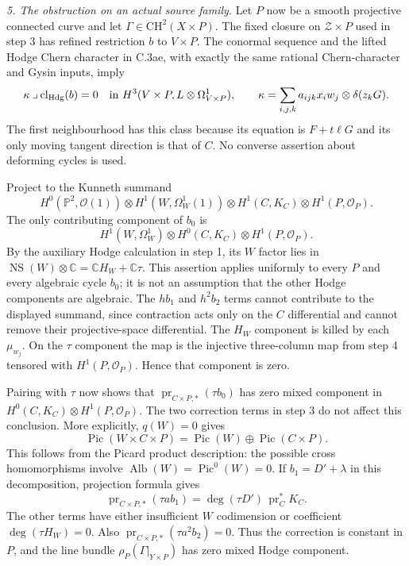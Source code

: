 \emph{5. The obstruction on an actual source family.}
Let $P$ now be a smooth projective connected curve
and let $\Gamma\in\mathrm{CH}^2(X\times P)$.
The fixed closure on $\mathcal Z\times P$ used in
step 3 has refined restriction $b$ to $V\times P$.
The conormal sequence and the lifted Hodge Chern
character in C.3ae, with exactly the same rational
Chern-character and Gysin inputs, imply
\[
 \kappa\mathbin{\lrcorner}\operatorname{cl}_{\mathrm{Hdg}}(b)
       =0\quad\hbox{in }
 H^3(V\times P,L\otimes\Omega^1_{V\times P}),
 \qquad
 \kappa=\sum_{i,j,k}a_{ijk}x_iw_j\otimes\delta(z_kG).
\]
The first neighbourhood has this class because its
equation is $F+t\ell G$ and its only moving tangent
direction is that of $C$. No converse assertion
about deforming cycles is used.

Project to the Kunneth summand
\[
 H^0(\mathbb P^2,\mathcal O(1))\otimes
 H^1(W,\Omega_W^1(1))\otimes
 H^1(C,K_C)\otimes H^1(P,\mathcal O_P).
\]
The only contributing component of $b_0$ is
\[
 H^1(W,\Omega_W^1)\otimes H^0(C,K_C)
                                  \otimes H^1(P,\mathcal O_P).
\]
By the auxiliary Hodge calculation in step 1, its
$W$ factor lies in
$\operatorname{NS}(W)\otimes\mathbb C
 =\mathbb C H_W+\mathbb C\tau$.
This assertion applies uniformly to every $P$ and
every algebraic cycle $b_0$; it is not an assumption
that the other Hodge components are algebraic.
The $h b_1$ and $h^2b_2$ terms cannot contribute to
the displayed summand, since contraction acts only
on the $C$ differential and cannot remove their
projective-space differential. The $H_W$ component
is killed by each $\mu_{w_j}$. On the $\tau$
component the map is the injective three-column
map from step 4 tensored with $H^1(P,\mathcal O_P)$.
Hence that component is zero.

Pairing with $\tau$ now shows that
$\operatorname{pr}_{C\times P,*}(\tau b_0)$ has
zero mixed component in
$H^0(C,K_C)\otimes H^1(P,\mathcal O_P)$.
The two correction terms in step 3 do not affect
this conclusion. More explicitly, $q(W)=0$ gives
\[
       \operatorname{Pic}(W\times C\times P)
       =\operatorname{Pic}(W)\oplus
                         \operatorname{Pic}(C\times P).
\]
This follows from the Picard product description:
the possible cross homomorphisms involve
$\operatorname{Alb}(W)=\operatorname{Pic}^0(W)=0$.
If $b_1=D'+\lambda$ in this decomposition, projection
formula gives
\[
 \operatorname{pr}_{C\times P,*}(\tau a b_1)
                 =\deg(\tau D')\,\operatorname{pr}_C^*K_C.
\]
The other terms have either insufficient $W$
codimension or coefficient $\deg(\tau H_W)=0$.
Also $\operatorname{pr}_{C\times P,*}(\tau a^2b_2)=0$.
Thus the correction is constant in $P$, and the
line bundle $\rho_P(\Gamma|_{Y\times P})$ has zero
mixed Hodge component.

